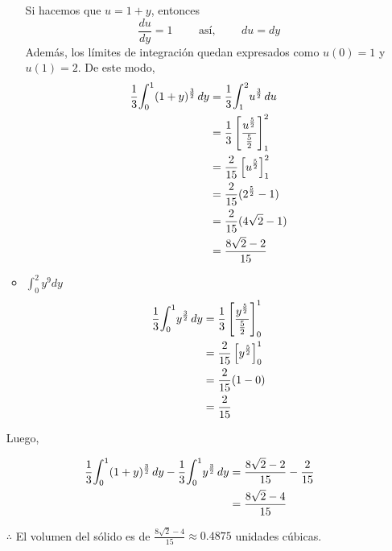 \documentclass[12pt]{exam}
\begin{document}
\begin{questions}
\begin{enumerate}[a)]
\begin{multicols}{2}
\begin{itemize}[format=\textbf]
        Si hacemos que $u=1+y$, entonces
        $$ \frac{du}{dy}=1 \qquad \text{ así, } \qquad du=dy $$
        Además, los límites de integración quedan expresados como $u(0)=1$ y $u(1)=2$. De este modo,
        \begin{align*}
          \frac{1}{3}\mathlarger{\int}_0^1(1+y)^{\frac{3}{2}}\, dy
          &= \frac{1}{3}\mathlarger{\int}_1^2 u^{\frac{3}{2}}\, du \\
          &= \frac{1}{3} \left[\frac{u^{\frac{5}{2}}}{\frac{5}{2}}\right]_1^2\\
          &= \frac{2}{15} \left[u^{\frac{5}{2}}\right]_1^2\\
          &= \frac{2}{15} (2^{\frac{5}{2}} - 1) \\
          &= \frac{2}{15} (4\sqrt{2} - 1) \\
          &= \frac{8\sqrt{2} - 2}{15}
        \end{align*}
      \item $\int_0^2y^9dy$
        \begin{align*}
          \frac{1}{3}\mathlarger{\int}_0^1 y^{\frac{3}{2}}\,dy
          &= \frac{1}{3} \left[\frac{y^{\frac{5}{2}}}{\frac{5}{2}}  \right]_0^1 \\
          &= \frac{2}{15}\left[y^{\frac{5}{2}} \right]_0^1 \\
          &= \frac{2}{15} (1-0) \\
          &=\frac{2}{15}
        \end{align*}
      \end{itemize}
    \end{multicols}

    Luego,

    \begin{align*}
      \frac{1}{3}\mathlarger{\int}_0^1(1+y)^{\frac{3}{2}}\, dy - \frac{1}{3}\mathlarger{\int}_0^1 y^{\frac{3}{2}}\,dy
      &= \frac{8\sqrt{2} - 2}{15} - \frac{2}{15} \\
      &= \frac{8\sqrt{2} - 4}{15}
    \end{align*}

    $\therefore$ El volumen del sólido es de $\frac{8\sqrt{2} - 4}{15} \approx 0.4875$ unidades cúbicas.
    

\end{enumerate}
\end{questions}
\end{document}
